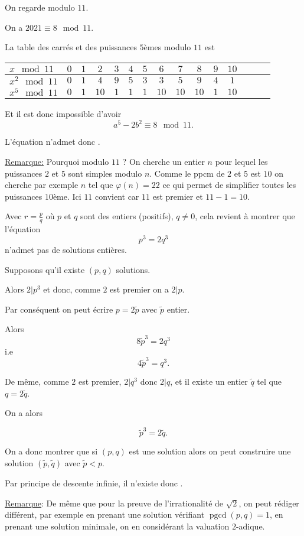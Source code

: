 \begin{sol}
  On regarde modulo $11$.

  On a $2021 \equiv 8 \mod 11$.

  La table des carrés et des puissances $5$èmes modulo $11$ est

  \begin{center}
    \begin{tabular}{|l|c|c|c|c|c|c|c|c|c|c|c|c|c|c|}
      \hline
      $x \mod 11$   & $0$ & $1$ & $2$  & $3$ & $4$ & $5$ & $6$  & $7$  & $8$  & $9$ & $10$ \\
      \hline
      $x^2 \mod 11$ & $0$ & $1$ & $4$  & $9$ & $5$ & $3$ & $3$  & $5$  & $9$  & $4$ & $1$  \\
      $x^5 \mod 11$ & $0$ & $1$ & $10$ & $1$ & $1$ & $1$ & $10$ & $10$ & $10$ & $1$ & $10$ \\
      \hline
    \end{tabular}
  \end{center}

  Et il est donc impossible d'avoir
  $$a^{5} - 2 b^2 \equiv 8 \mod 11.$$


  L'équation n'admet donc .

  \underline{Remarque:} Pourquoi modulo $11$ ? On cherche un entier $n$ pour lequel les puissances $2$ et $5$ sont simples modulo $n$. Comme le ppcm de $2$ et $5$ est $10$ on cherche par exemple $n$ tel que $\varphi(n)=22$ ce qui permet de simplifier toutes les puissances $10$ème. Ici $11$ convient car $11$ est premier et $11-1 = 10$.
\end{sol}
\begin{sol}
  Avec $r = \frac{p}{q}$ où $p$ et $q$ sont des entiers (positifs), $q \neq 0$, cela revient à montrer que l'équation
  $$p^3 = 2 q^3$$
  n'admet pas de solutions entières.

  Supposons qu'il existe $(p,q)$ solutions.

  Alors $2 | p^3$ et donc, comme $2$ est premier on a $2 | p$.

  Par conséquent on peut écrire $p = 2 \tilde{p}$ avec $\tilde{p}$ entier.

  Alors
  $$8 \tilde{p}^3 = 2 q^3$$
  i.e
  $$4 \tilde{p}^3 =  q^3.$$

  De même, comme $2$ est premier, $2 | q^3$ donc $2 | q$, et il existe un entier $\tilde{q}$ tel que $q = 2 \tilde{q}$.

  On a alors

  $$\tilde{p}^3 = 2 \tilde{q}.$$


  On a donc montrer que si $(p,q)$ est une solution alors on peut construire une solution $(\tilde{p},\tilde{q})$ avec $\tilde{p} < p$.

  Par principe de descente infinie, il n'existe donc .

  \underline{Remarque}: De même que pour la preuve de l'irrationalité de $\sqrt{2}$, on peut rédiger différent, par exemple en prenant une solution vérifiant $\operatorname{pgcd}(p,q) = 1$, en prenant une solution minimale, on en considérant la valuation $2$-adique.
\end{sol}
